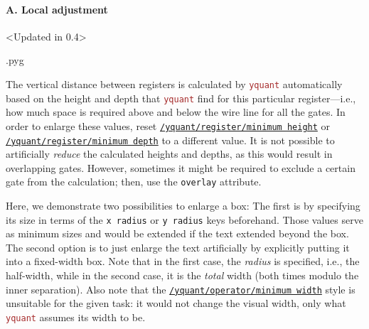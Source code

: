 \documentclass{scrartcl}
\makeatletter
\newenvironment{codeexample}{%
   \VerbatimEnvironment%
   \let\FVB@VerbatimOut\minted@FVB@VerbatimOut
   \let\FVE@VerbatimOut\minted@FVE@VerbatimOut
   \minted@configlang{tex}%
   \minted@fvset
   \begin{VerbatimOut}[codes={\catcode`\^^I=12},firstline,lastline]{\minted@jobname.pyg}%
}{
   \end{VerbatimOut}%
   \minted@langlinenoson%
   \savebox\codeexamplebox{ \minted@jobname.pyg}%
   \ifdim\wd\codeexamplebox>\dimexpr.5\linewidth-3mm\relax%
      \wd\codeexamplebox=.5\linewidth%
   \else%
      \wd\codeexamplebox=\dimexpr\wd\codeexamplebox+3mm\relax%
   \fi%
   \noindent\begin{minipage}{\wd\codeexamplebox}%
      \centering%
      \usebox\codeexamplebox%
   \end{minipage}%
   \begin{minipage}{\dimexpr\linewidth-\wd\codeexamplebox\relax}%
      \minted@pygmentize{\minted@lang}%
   \end{minipage}%
   \minted@langlinenosoff%
   \par%
}
\newenvironment{codeexample*}{%
   \VerbatimEnvironment%
   \let\FVB@VerbatimOut\minted@FVB@VerbatimOut
   \let\FVE@VerbatimOut\minted@FVE@VerbatimOut
   \minted@configlang{tex}%
   \minted@fvset
   \begin{VerbatimOut}[codes={\catcode`\^^I=12},firstline,lastline]{\minted@jobname.pyg}%
}{
   \end{VerbatimOut}%
   \minted@langlinenoson%
   \begin{adjustbox}{center}
       \minted@jobname.pyg %
   \end{adjustbox}\nopagebreak
   \minted@pygmentize{\minted@lang}%
   \minted@langlinenosoff%
   \par%
}
\def\pkg#1{\textcolor{brown}{\texttt{#1}}}
\def\style#1{\hyperref[style:#1]{\texttt{#1}}}
\def\Yquant{\pkg{yquant}}
\makeatother
\begin{document}
            \paragraph{A. Local adjustment}\leavevmode
               \begin{example}<Updated in 0.4>
                  \begin{codeexample}
                  \end{codeexample}
                  The vertical distance between registers is calculated by \Yquant{} automatically based on the height and depth that \Yquant{} find for this particular register---i.e., how much space is required above and below the wire line for all the gates.
                  In order to enlarge these values, reset \style{/yquant/register/minimum height} or \style{/yquant/register/minimum depth} to a different value.
                  It is not possible to artificially \emph{reduce} the calculated heights and depths, as this would result in overlapping gates.
                  However, sometimes it might be required to exclude a certain gate from the calculation; then, use the \texttt{overlay} attribute.
               \end{example}

               \begin{example}
                  \begin{codeexample*}
                  \end{codeexample*}
                  Here, we demonstrate two possibilities to enlarge a box: The first is by specifying its size in terms of the \texttt{x radius} or \texttt{y radius} keys beforehand.
                  Those values serve as minimum sizes and would be extended if the text extended beyond the box.
                  The second option is to just enlarge the text artificially by explicitly putting it into a fixed\hyp width box.
                  Note that in the first case, the \emph{radius} is specified, i.e., the half\hyp width, while in the second case, it is the \emph{total} width (both times modulo the inner separation).
                  Also note that the \style{/yquant/operator/minimum width} style is unsuitable for the given task: it would not change the visual width, only what \Yquant{} assumes its width to be.
               \end{example}
\end{document}

